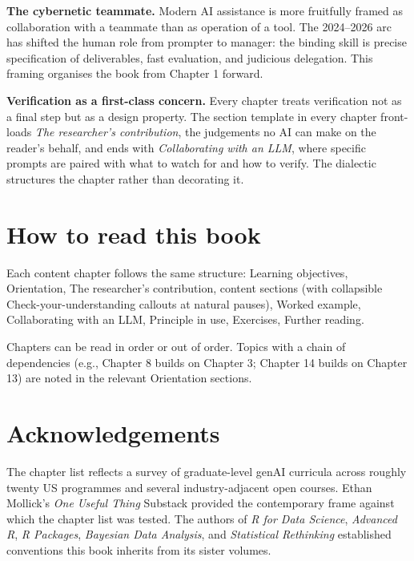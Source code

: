 \documentclass[
  letterpaper,
  11pt]{scrbook}
\begin{document}
\textbf{The cybernetic teammate.} Modern AI assistance is more
fruitfully framed as collaboration with a teammate than as operation of
a tool. The 2024--2026 arc has shifted the human role from prompter to
manager: the binding skill is precise specification of deliverables,
fast evaluation, and judicious delegation. This framing organises the
book from Chapter 1 forward.

\textbf{Verification as a first-class concern.} Every chapter treats
verification not as a final step but as a design property. The section
template in every chapter front-loads \emph{The researcher's
contribution}, the judgements no AI can make on the reader's behalf, and
ends with \emph{Collaborating with an LLM}, where specific prompts are
paired with what to watch for and how to verify. The dialectic
structures the chapter rather than decorating it.

\section*{How to read this book}\label{how-to-read-this-book}


Each content chapter follows the same structure: Learning objectives,
Orientation, The researcher's contribution, content sections (with
collapsible Check-your-understanding callouts at natural pauses), Worked
example, Collaborating with an LLM, Principle in use, Exercises, Further
reading.

Chapters can be read in order or out of order. Topics with a chain of
dependencies (e.g., Chapter 8 builds on Chapter 3; Chapter 14 builds on
Chapter 13) are noted in the relevant Orientation sections.

\section*{Acknowledgements}\label{acknowledgements}


The chapter list reflects a survey of graduate-level genAI curricula
across roughly twenty US programmes and several industry-adjacent open
courses. Ethan Mollick's \emph{One Useful Thing} Substack provided the
contemporary frame against which the chapter list was tested. The
authors of \emph{R for Data Science}, \emph{Advanced R}, \emph{R
Packages}, \emph{Bayesian Data Analysis}, and \emph{Statistical
Rethinking} established conventions this book inherits from its sister
volumes.
\end{document}
